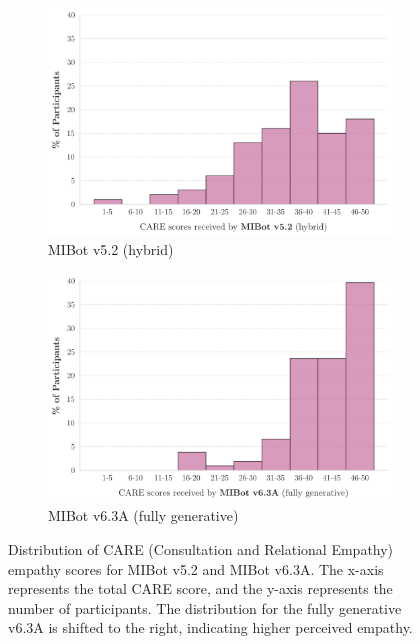 \begin{figure}[htbp]
    \centering
    \begin{subfigure}[b]{0.48\textwidth}
        \centering
        \includegraphics[width=\textwidth]{fig/MIV5.2_care_scores_histogram.png}
        \caption{MIBot v5.2 (hybrid)}
        \label{fig:care_v5.2}
    \end{subfigure}
    \hfill
    \begin{subfigure}[b]{0.48\textwidth}
        \centering
        \includegraphics[width=\textwidth]{fig/2024-11-14-MIV6.3A-2024-11-22-MIV6.3A_care_scores_histogram.png}
        \caption{MIBot v6.3A (fully generative)}
        \label{fig:care_v6.3}
    \end{subfigure}
    \caption[CARE Score Distributions for MIBot v5.2 and v6.3A]{Distribution of CARE (Consultation and Relational Empathy) empathy scores for MIBot v5.2 and MIBot v6.3A. The x-axis represents the total CARE score, and the y-axis represents the number of participants. The distribution for the fully generative v6.3A is shifted to the right, indicating higher perceived empathy.}
    \label{fig:care_distributions}
\end{figure}

